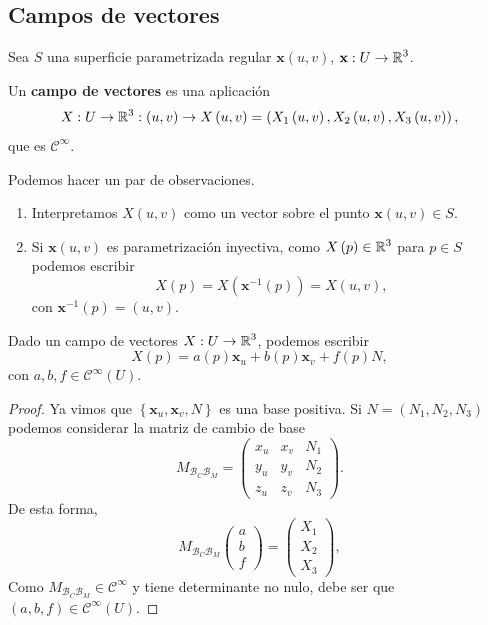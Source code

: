 \subsection{Campos de vectores}
Sea $\displaystyle S $ una superficie parametrizada regular $\displaystyle \textbf{x} \left(u,v\right) $, $\displaystyle \textbf{x} : U \to \mathbb{R}^{3} $.
\begin{definition}
 Un \textbf{campo de vectores} es una aplicación
\[ X : U \to \mathbb{R}^{3} : \left(u,v\right)\to X\left(u,v\right)=\left(X_{1}\left(u,v\right), X_{2}\left(u,v\right), X_{3}\left(u,v\right)\right) ,\]
que es $\displaystyle \mathcal{C}^{\infty } $.
\end{definition}
\begin{observation} Podemos hacer un par de observaciones.
\begin{enumerate}
\item Interpretamos $\displaystyle X\left(u,v\right) $ como un vector sobre el punto $\displaystyle \textbf{x} \left(u,v\right)\in S $. 
\item Si $\displaystyle \textbf{x} \left(u,v\right) $ es parametrización inyectiva, como $\displaystyle X\left(p\right)\in \mathbb{R}^{3} $ para $\displaystyle p \in S $ podemos escribir
	\[X\left(p\right)=X\left( \textbf{x} ^{-1}\left(p\right)\right)=X\left(u,v\right) ,\]
	con $\displaystyle \textbf{x} ^{-1}\left(p\right)=\left(u,v\right) $. 
\end{enumerate}
\end{observation}
\begin{lema}
Dado un campo de vectores $\displaystyle X : U \to \mathbb{R}^{3} $, podemos escribir  
\[X\left(p\right)=a\left(p\right) \textbf{x} _{u} + b\left(p\right) \textbf{x} _{v} +f \left(p\right)N ,\]
con $\displaystyle a,b,f\in \mathcal{C}^{\infty }\left(U\right) $. 
\end{lema}
\begin{proof}
	Ya vimos que $\displaystyle \left\{ \textbf{x} _{u}, \textbf{x} _{v}, N\right\}  $ es una base positiva. Si $\displaystyle N = \left(N_{1}, N_{2}, N_{3}\right) $ podemos considerar la matriz de cambio de base
\[M_{\mathcal{B}_{C}\mathcal{B}_{M}}=\begin{pmatrix} x_{u} & x_{v} & N_{1} \\ y_{u} & y_{v} & N_{2} \\ z_{u} & z_{v} & N_{3} \end{pmatrix} .\]
De esta forma,  
\[M_{\mathcal{B}_{C}\mathcal{B}_{M}}\begin{pmatrix} a \\ b \\ f \end{pmatrix}=\begin{pmatrix} X_{1} \\ X_{2} \\ X_{3} \end{pmatrix} ,\]
 Como $\displaystyle M_{\mathcal{B}_{C}\mathcal{B}_{M}}\in \mathcal{C}^{\infty } $ y tiene determinante no nulo, debe ser que $\displaystyle \left(a,b,f\right)\in \mathcal{C}^{\infty }\left(U\right) $. 
\end{proof}
